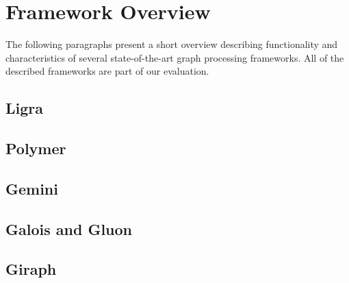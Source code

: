 
\section{Framework Overview}
The following paragraphs present a short overview describing functionality and characteristics of several state-of-the-art graph processing frameworks.
All of the described frameworks are part of our evaluation.

\subsection{Ligra}


\subsection{Polymer}


\subsection{Gemini}


\subsection{Galois and Gluon}


\subsection{Giraph}





